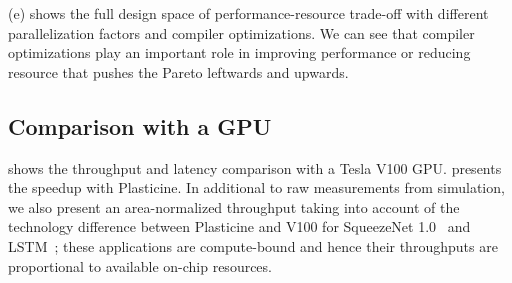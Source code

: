  (e) shows the full design space of performance-resource trade-off with
different parallelization factors and compiler optimizations.
We can see that compiler optimizations play an important role in improving performance or
reducing resource that pushes the Pareto leftwards and upwards.


\subsection{Comparison with a GPU}

 shows the throughput and latency comparison with a Tesla V100 GPU.
 presents the speedup with Plasticine.
In additional to raw measurements from simulation, we also present an area-normalized throughput
taking into account of the technology difference between Plasticine and V100 
for SqueezeNet 1.0~\cite{squeezenet} and LSTM~\cite{lstm}; 
these applications are compute-bound and hence their throughputs are proportional to available 
on-chip resources.

